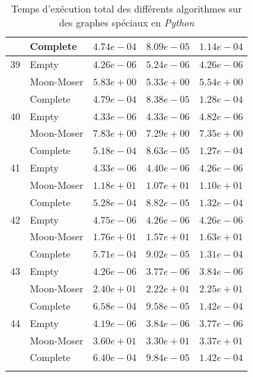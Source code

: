 \documentclass[12pt,a4paper]{article}
\begin{document}
\begin{longtable}{|l||l|l|l|l|}
  & Complete & $4.74e-04$ & $8.09e-05$ & $1.14e-04$ \\
  \hline
  39 & Empty & $4.26e-06$ & $5.24e-06$ & $4.26e-06$ \\
  & Moon-Moser & $5.83e+00$ & $5.33e+00$ & $5.54e+00$ \\
  & Complete & $4.79e-04$ & $8.38e-05$ & $1.28e-04$ \\
  \hline
  40 & Empty & $4.33e-06$ & $4.33e-06$ & $4.82e-06$ \\
  & Moon-Moser & $7.83e+00$ & $7.29e+00$ & $7.35e+00$ \\
  & Complete & $5.18e-04$ & $8.63e-05$ & $1.27e-04$ \\
  \hline
  41 & Empty & $4.33e-06$ & $4.40e-06$ & $4.26e-06$ \\
  & Moon-Moser & $1.18e+01$ & $1.07e+01$ & $1.10e+01$ \\
  & Complete & $5.28e-04$ & $8.82e-05$ & $1.32e-04$ \\
  \hline
  42 & Empty & $4.75e-06$ & $4.26e-06$ & $4.26e-06$ \\
  & Moon-Moser & $1.76e+01$ & $1.57e+01$ & $1.63e+01$ \\
  & Complete & $5.71e-04$ & $9.02e-05$ & $1.31e-04$ \\
  \hline
  43 & Empty & $4.26e-06$ & $3.77e-06$ & $3.84e-06$ \\
  & Moon-Moser & $2.40e+01$ & $2.22e+01$ & $2.25e+01$ \\
  & Complete & $6.58e-04$ & $9.58e-05$ & $1.42e-04$ \\
  \hline
  44 & Empty & $4.19e-06$ & $3.84e-06$ & $3.77e-06$ \\
  & Moon-Moser & $3.60e+01$ & $3.30e+01$ & $3.37e+01$ \\
  & Complete & $6.40e-04$ & $9.84e-05$ & $1.42e-04$ \\
  \hline
  \caption{Temps d'exécution total des différents algorithmes sur des graphes spéciaux en \emph{Python}}
\end{longtable}
\end{document}
